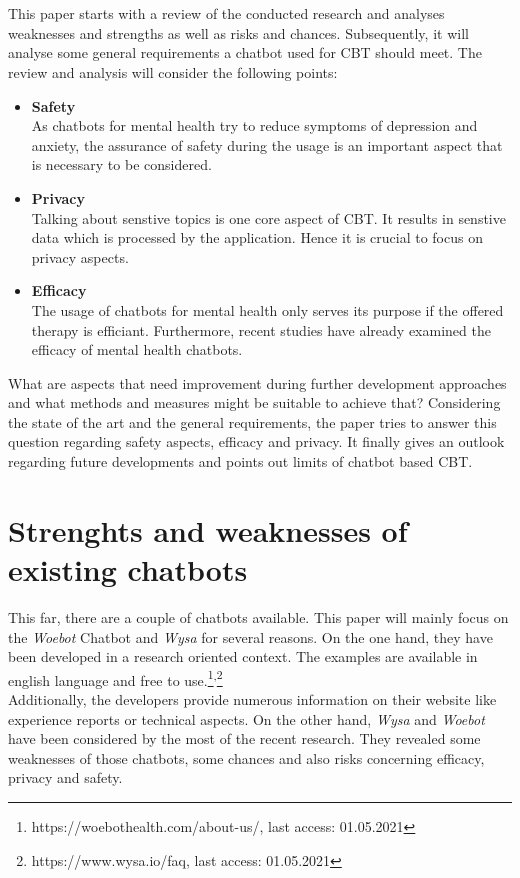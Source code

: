 \documentclass[sigconf, nonacm]{acmart}
\begin{document}
\\\\
This paper starts with a review of the conducted research and analyses weaknesses and strengths as well as risks and chances. 
Subsequently, it will analyse some general requirements a chatbot used for CBT should meet.
The review and analysis will consider the following points:
\\
\begin{itemize}
  \item{\textbf{Safety}}\\
  As chatbots for mental health try to reduce symptoms of depression and anxiety, the assurance of safety during the usage is an important aspect that is necessary to be considered.
  \\
  \item{\textbf{Privacy}}\\
  Talking about senstive topics is one core aspect of CBT. It results in senstive data which is processed by the application. Hence it is crucial to focus on privacy aspects.
  \\
  \item{\textbf{Efficacy}}\\
  The usage of chatbots for mental health only serves its purpose if the offered therapy is efficiant. Furthermore, recent studies have already examined the efficacy of mental health chatbots.\cite{Fitzpatrick2017,Inkster}
  \\
\end{itemize}
What are aspects that need improvement during further development approaches and what methods and measures might be suitable to achieve that? 
Considering the state of the art and the general requirements, the paper tries to answer this question regarding safety aspects, efficacy and privacy.
It finally gives an outlook regarding future developments and points out limits of chatbot based CBT.


\section{Strenghts and weaknesses of existing chatbots}
\label{sec:two}
This far, there are a couple of chatbots available. This paper will mainly focus on the \emph{Woebot} Chatbot and \emph{Wysa} for several reasons.
On the one hand, they have been developed in a research oriented context. 
The examples are available in english language and free to use.\footnote{https://woebothealth.com/about-us/, last access: 01.05.2021}\textsuperscript{,}\footnote{https://www.wysa.io/faq, last access: 01.05.2021}
\\
Additionally, the developers provide numerous information on their website
like experience reports or technical aspects.
On the other hand, \emph{Wysa} and \emph{Woebot} have been considered by the most of the recent research.
They revealed some weaknesses of those chatbots, some chances and also risks concerning efficacy, privacy and safety.
\end{document}
